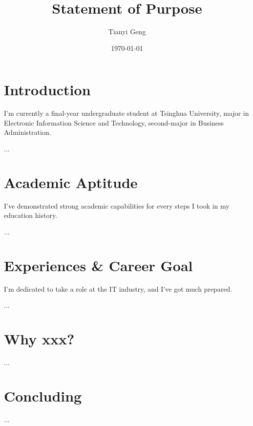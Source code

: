 \documentclass[12pt]{article}
\title{Statement of Purpose}
\author{Tianyi Geng}
\date{\today}
\begin{document}
\maketitle
\onehalfspacing
\section{Introduction}


I'm currently a final-year undergraduate student at Tsinghua University, major in Electronic Information Science and Technology, second-major in Business Administration. 

...

\section{Academic Aptitude}

I've demonstrated strong academic capabilities for every steps I took in my education history. 

...



\section{Experiences \& Career Goal}

I'm dedicated to take a role at the IT industry, and I've got much prepared. 

...

\section{Why xxx? }

...

\section{Concluding}

...
\end{document}
